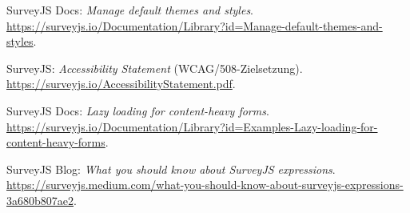 \documentclass[11pt,a4paper]{article}
\begin{document}
\begin{thebibliography}{99}
SurveyJS Docs: \emph{Manage default themes and styles}.\\
\url{https://surveyjs.io/Documentation/Library?id=Manage-default-themes-and-styles}.

SurveyJS: \emph{Accessibility Statement} (WCAG/508-Zielsetzung).\\
\url{https://surveyjs.io/AccessibilityStatement.pdf}.

SurveyJS Docs: \emph{Lazy loading for content-heavy forms}.\\
\url{https://surveyjs.io/Documentation/Library?id=Examples-Lazy-loading-for-content-heavy-forms}.

SurveyJS Blog: \emph{What you should know about SurveyJS expressions}.\\
\url{https://surveyjs.medium.com/what-you-should-know-about-surveyjs-expressions-3a680b807ae2}.

\end{thebibliography}
\end{document}
